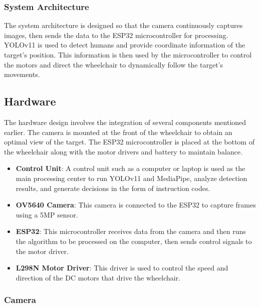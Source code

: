 \vspace{5pt}
\subsubsection{System Architecture}
\label{subsubsec:systemarchitecture}

The system architecture is designed so that the camera continuously captures images, then sends the data to the ESP32 microcontroller for processing. YOLOv11 is used to detect humans and provide coordinate information of the target's position. This information is then used by the microcontroller to control the motors and direct the wheelchair to dynamically follow the target's movements.

\subsection{Hardware}
\label{subsec:hardware}

The hardware design involves the integration of several components mentioned earlier. The camera is mounted at the front of the wheelchair to obtain an optimal view of the target. The ESP32 microcontroller is placed at the bottom of the wheelchair along with the motor drivers and battery to maintain balance.

\begin{itemize}
    \item \textbf{Control Unit}: A control unit such as a computer or laptop is used as the main processing center to run YOLOv11 and MediaPipe, analyze detection results, and generate decisions in the form of instruction codes.
    \item \textbf{OV5640 Camera}: This camera is connected to the ESP32 to capture frames using a 5MP sensor.
    \item \textbf{ESP32}: This microcontroller receives data from the camera and then runs the algorithm to be processed on the computer, then sends control signals to the motor driver.
    \item \textbf{L298N Motor Driver}: This driver is used to control the speed and direction of the DC motors that drive the wheelchair.
\end{itemize}

\vspace{5pt}
\subsubsection{Camera}
\label{subsubsec:camera}


